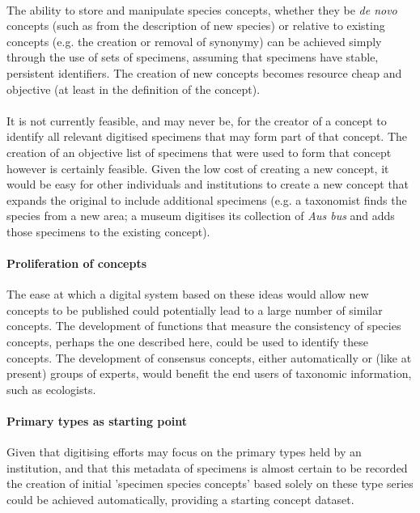\documentclass{article}
\begin{document}
   \paragraph{}
   The ability to store and manipulate species concepts, whether they be \textit{de novo} concepts (such as from the description of new species) or relative to existing concepts (e.g. the creation or removal of synonymy) can be achieved simply through the use of sets of specimens, assuming that specimens have stable, persistent identifiers. The creation of new concepts becomes resource cheap and objective (at least in the definition of the concept).
   
   \paragraph{}
   It is not currently feasible, and may never be, for the creator of a concept to identify all relevant digitised specimens that may form part of that concept. The creation of an objective list of specimens that were used to form that concept however is certainly feasible. Given the low cost of creating a new concept, it would be easy for other individuals and institutions to create a new concept that expands the original to include additional specimens (e.g. a taxonomist finds the species from a new area; a museum digitises its collection of \textit{Aus bus} and adds those specimens to the existing concept).
   
   \paragraph{Proliferation of concepts}
   The ease at which a digital system based on these ideas would allow new concepts to be published could potentially lead to a large number of similar concepts. The development of functions that measure the consistency of species concepts, perhaps the one described here, could be used to identify these concepts. The development of consensus concepts, either automatically or (like at present) groups of experts, would benefit the end users of taxonomic information, such as ecologists. 
   
   \paragraph{Primary types as starting point}
   Given that digitising efforts may focus on the primary types held by an institution, and that this metadata of specimens is almost certain to be recorded the creation of initial 'specimen species concepts' based solely on these type series could be achieved automatically, providing a starting concept dataset.
   
\end{document}

